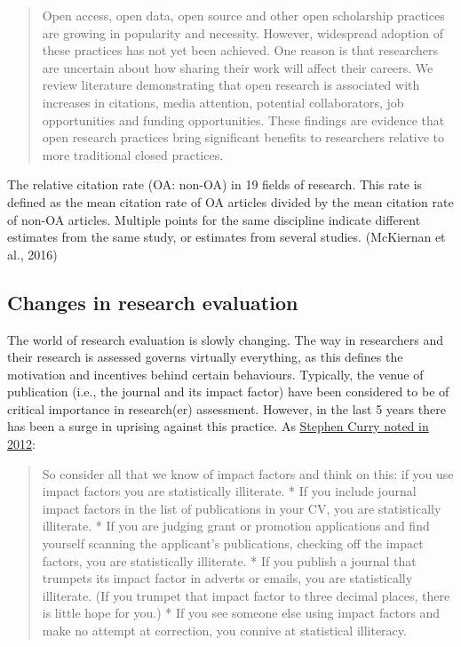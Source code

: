 \documentclass[]{book}
\begin{document}
{{{{\begin{quote}
Open access, open data, open source and other open scholarship practices are growing in popularity and necessity. However, widespread adoption of these practices has not yet been achieved. One reason is that researchers are uncertain about how sharing their work will affect their careers. We review literature demonstrating that open research is associated with increases in citations, media attention, potential collaborators, job opportunities and funding opportunities. These findings are evidence that open research practices bring significant benefits to researchers relative to more traditional closed practices.
\end{quote}

The relative citation rate (OA: non-OA) in 19 fields of research. This rate is defined as the mean citation rate of OA articles divided by the mean citation rate of non-OA articles. Multiple points for the same discipline indicate different estimates from the same study, or estimates from several studies. (McKiernan et al., 2016)

\hypertarget{changes-in-research-evaluation}{%
\subsection{Changes in research evaluation }\label{changes-in-research-evaluation}}

The world of research evaluation is slowly changing. The way in researchers and their research is assessed governs virtually everything, as this defines the motivation and incentives behind certain behaviours. Typically, the venue of publication (i.e., the journal and its impact factor) have been considered to be of critical importance in research(er) assessment. However, in the last 5 years there has been a surge in uprising against this practice. As \href{http://occamstypewriter.org/scurry/2012/08/13/sick-of-impact-factors/}{Stephen Curry noted in 2012}:

\begin{quote}
So consider all that we know of impact factors and think on this: if you use impact factors you are statistically illiterate.
* If you include journal impact factors in the list of publications in your CV, you are statistically illiterate.
* If you are judging grant or promotion applications and find yourself scanning the applicant's publications, checking off the impact factors, you are statistically illiterate.
* If you publish a journal that trumpets its impact factor in adverts or emails, you are statistically illiterate. (If you trumpet that impact factor to three decimal places, there is little hope for you.)
* If you see someone else using impact factors and make no attempt at correction, you connive at statistical illiteracy.
\end{quote}

}}}}
\end{document}
